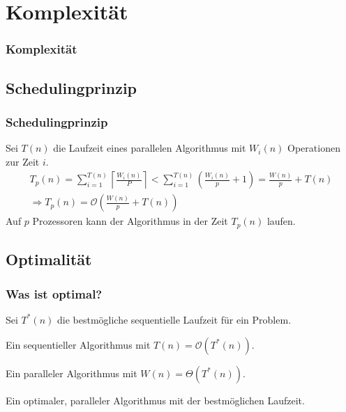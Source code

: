 \section{Komplexität}
\begin{frame}
    \frametitle{Komplexität}
    \tableofcontents[
        currentsection,
        hideothersubsections,
        sectionstyle=show/shaded,
    ]
\end{frame}

\subsection{Schedulingprinzip}
\begin{frame}
    \frametitle{Schedulingprinzip}
    Sei $T(n)$ die Laufzeit eines parallelen Algorithmus mit $W_i(n)$
    Operationen zur Zeit $i$.
    \begin{equation}
        \begin{gathered}
            T_p(n) = \sum_{i=1}^{T(n)} \left\lceil \frac{W_i(n)}{P} \right\rceil
            <
            \sum_{i=1}^{T(n)} \left( \frac{W_i(n)}{p} + 1 \right)
            = \frac{W(n)}{p} + T(n) \\
            \Rightarrow T_p(n) = \mathcal{O} \left( \frac{W(n)}{p} + T(n) \right)
        \end{gathered}
    \end{equation}
    Auf $p$ Prozessoren kann der Algorithmus in der Zeit $T_p(n)$ laufen.
\end{frame}

\subsection{Optimalität}
\begin{frame}
    \frametitle{Was ist optimal?}
    Sei $T^\ast(n)$ die bestmögliche sequentielle Laufzeit für ein Problem.
    \pause
    \begin{definition}
        Ein sequentieller Algorithmus mit $T(n) = \mathcal{O}(T^\ast(n))$.
    \end{definition}
    \pause
    \begin{definition}[optimal]
        Ein paralleler Algorithmus mit $W(n) = \Theta(T^\ast(n))$.
    \end{definition}
    \pause
    \begin{definition}
        Ein optimaler, paralleler Algorithmus mit der bestmöglichen Laufzeit.
    \end{definition}
\end{frame}

